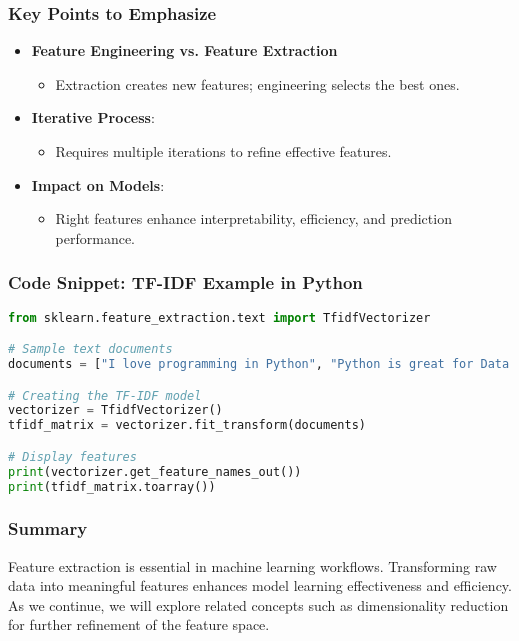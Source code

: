 \documentclass[aspectratio=169]{beamer}
\begin{document}
\begin{frame}[fragile]
    \frametitle{Key Points to Emphasize}
    \begin{itemize}
        \item \textbf{Feature Engineering vs. Feature Extraction}
            \begin{itemize}
                \item Extraction creates new features; engineering selects the best ones.
            \end{itemize}
        
        \item \textbf{Iterative Process}:
            \begin{itemize}
                \item Requires multiple iterations to refine effective features.
            \end{itemize}
        
        \item \textbf{Impact on Models}:
            \begin{itemize}
                \item Right features enhance interpretability, efficiency, and prediction performance.
            \end{itemize}
    \end{itemize}
\end{frame}

\begin{frame}[fragile]
    \frametitle{Code Snippet: TF-IDF Example in Python}
    \begin{lstlisting}[language=Python]
from sklearn.feature_extraction.text import TfidfVectorizer

# Sample text documents
documents = ["I love programming in Python", "Python is great for Data Science"]

# Creating the TF-IDF model
vectorizer = TfidfVectorizer()
tfidf_matrix = vectorizer.fit_transform(documents)

# Display features
print(vectorizer.get_feature_names_out())
print(tfidf_matrix.toarray())
    \end{lstlisting}
\end{frame}

\begin{frame}
    \frametitle{Summary}
    Feature extraction is essential in machine learning workflows. Transforming raw data into meaningful features enhances model learning effectiveness and efficiency. As we continue, we will explore related concepts such as dimensionality reduction for further refinement of the feature space.
\end{frame}
\end{document}
